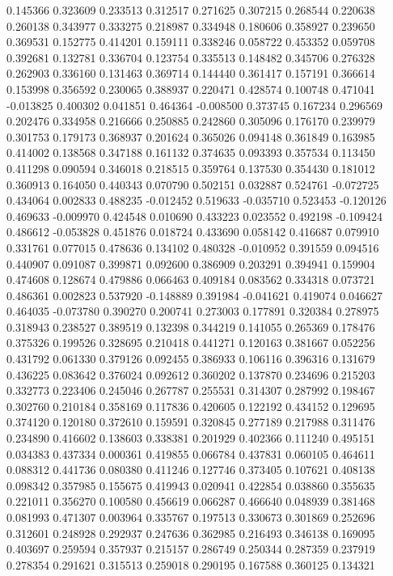0.145366
0.323609
0.233513
0.312517
0.271625
0.307215
0.268544
0.220638
0.260138
0.343977
0.333275
0.218987
0.334948
0.180606
0.358927
0.239650
0.369531
0.152775
0.414201
0.159111
0.338246
0.058722
0.453352
0.059708
0.392681
0.132781
0.336704
0.123754
0.335513
0.148482
0.345706
0.276328
0.262903
0.336160
0.131463
0.369714
0.144440
0.361417
0.157191
0.366614
0.153998
0.356592
0.230065
0.388937
0.220471
0.428574
0.100748
0.471041
-0.013825
0.400302
0.041851
0.464364
-0.008500
0.373745
0.167234
0.296569
0.202476
0.334958
0.216666
0.250885
0.242860
0.305096
0.176170
0.239979
0.301753
0.179173
0.368937
0.201624
0.365026
0.094148
0.361849
0.163985
0.414002
0.138568
0.347188
0.161132
0.374635
0.093393
0.357534
0.113450
0.411298
0.090594
0.346018
0.218515
0.359764
0.137530
0.354430
0.181012
0.360913
0.164050
0.440343
0.070790
0.502151
0.032887
0.524761
-0.072725
0.434064
0.002833
0.488235
-0.012452
0.519633
-0.035710
0.523453
-0.120126
0.469633
-0.009970
0.424548
0.010690
0.433223
0.023552
0.492198
-0.109424
0.486612
-0.053828
0.451876
0.018724
0.433690
0.058142
0.416687
0.079910
0.331761
0.077015
0.478636
0.134102
0.480328
-0.010952
0.391559
0.094516
0.440907
0.091087
0.399871
0.092600
0.386909
0.203291
0.394941
0.159904
0.474608
0.128674
0.479886
0.066463
0.409184
0.083562
0.334318
0.073721
0.486361
0.002823
0.537920
-0.148889
0.391984
-0.041621
0.419074
0.046627
0.464035
-0.073780
0.390270
0.200741
0.273003
0.177891
0.320384
0.278975
0.318943
0.238527
0.389519
0.132398
0.344219
0.141055
0.265369
0.178476
0.375326
0.199526
0.328695
0.210418
0.441271
0.120163
0.381667
0.052256
0.431792
0.061330
0.379126
0.092455
0.386933
0.106116
0.396316
0.131679
0.436225
0.083642
0.376024
0.092612
0.360202
0.137870
0.234696
0.215203
0.332773
0.223406
0.245046
0.267787
0.255531
0.314307
0.287992
0.198467
0.302760
0.210184
0.358169
0.117836
0.420605
0.122192
0.434152
0.129695
0.374120
0.120180
0.372610
0.159591
0.320845
0.277189
0.217988
0.311476
0.234890
0.416602
0.138603
0.338381
0.201929
0.402366
0.111240
0.495151
0.034383
0.437334
0.000361
0.419855
0.066784
0.437831
0.060105
0.464611
0.088312
0.441736
0.080380
0.411246
0.127746
0.373405
0.107621
0.408138
0.098342
0.357985
0.155675
0.419943
0.020941
0.422854
0.038860
0.355635
0.221011
0.356270
0.100580
0.456619
0.066287
0.466640
0.048939
0.381468
0.081993
0.471307
0.003964
0.335767
0.197513
0.330673
0.301869
0.252696
0.312601
0.248928
0.292937
0.247636
0.362985
0.216493
0.346138
0.169095
0.403697
0.259594
0.357937
0.215157
0.286749
0.250344
0.287359
0.237919
0.278354
0.291621
0.315513
0.259018
0.290195
0.167588
0.360125
0.134321
